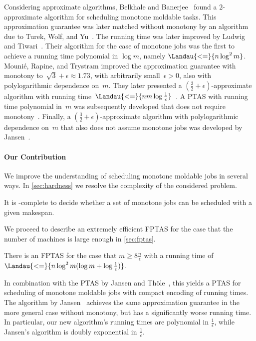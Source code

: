 Considering approximate algorithms,
Belkhale and Banerjee~\cite{belkhale90} found a $2$-approximate algorithm for scheduling monotone moldable tasks.
This approximation guarantee was later matched without monotony by an algorithm due to Turek, Wolf, and Yu~\cite{turek92}.
The running time was later improved by Ludwig and Tiwari~\cite{ludwig94}.
Their algorithm for the case of monotone jobs was the first to achieve a running time polynomial in $\log m$, namely $\Landau{<=}{n \log^2 m}$.
Mounié, Rapine, and Trystram improved the approximation guarantee with monotony to~$\sqrt{3} + \epsilon \approx 1.73$,
with arbitrarily small~$\epsilon > 0$,
also with polylogarithmic dependence on~$m$.
They later presented a $(\frac{3}{2} + \epsilon)$-approximate algorithm with running time~$\Landau{<=}{nm \log \frac{1}{\epsilon}}$~\cite{mounie04,mounie07}.
A PTAS with running time polynomial in~$m$ was subsequently developed that does not require monotony~\cite{jansen10}.
Finally, a $(\frac{3}{2} + \epsilon)$-approximate algorithm with polylogarithmic dependence on~$m$ that also does not assume monotone jobs was developed by Jansen~\cite{jansen13a}.


\paragraph*{Our Contribution}

We improve the understanding of scheduling monotone moldable jobs in several ways.
In \cref{sec:hardness} we resolve the complexity of the considered problem.
\begin{theorem}
  \label{thm:np-complete}
  It is -complete to decide whether a set of monotone jobs can be scheduled with a given makespan.
\end{theorem}
We proceed to describe an extremely efficient FPTAS for the case that the number of machines is large enough in \cref{sec:fptas}.
\begin{theorem}
  \label{thm:fptas}
  There is an FPTAS  for the case that $m \geq 8\frac{n}{\epsilon}$
  with a running time of $\Landau{<=}{n \log^2 m (\log m + \log \frac{1}{\epsilon})}$.
\end{theorem}
In combination with the PTAS by Jansen and Thöle~\cite{jansen10},
this yields a PTAS for scheduling of monotone moldable jobs
with compact encoding of running times.
The algorithm by Jansen~\cite{jansen13a} achieves the same approximation guarantee
in the more general case without monotony,
but has a significantly worse running time.
In particular, our new algorithm's running times are polynomial in $\frac{1}{\epsilon}$,
while Jansen's algorithm is doubly exponential in $\frac{1}{\epsilon}$.

